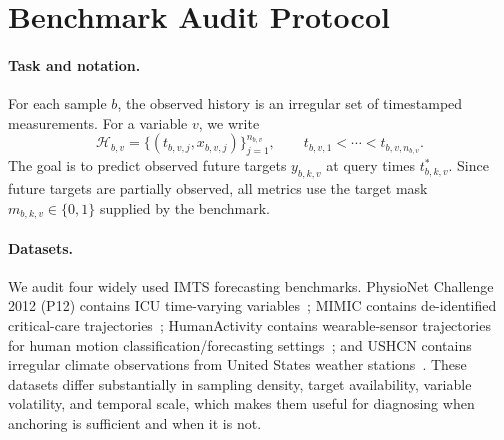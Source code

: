 \documentclass{article}
\begin{document}
\section{Benchmark Audit Protocol}

\paragraph{Task and notation.}
For each sample $b$, the observed history is an irregular set of timestamped
measurements. For a variable $v$, we write
\begin{equation}
    \mathcal H_{b,v}=\{(t_{b,v,j},x_{b,v,j})\}_{j=1}^{n_{b,v}},
    \qquad t_{b,v,1}<\cdots<t_{b,v,n_{b,v}}.
\end{equation}
The goal is to predict observed future targets $y_{b,k,v}$ at query times
$t^*_{b,k,v}$. Since future targets are partially observed, all
metrics use the target mask $m_{b,k,v}\in\{0,1\}$ supplied by the benchmark.

\paragraph{Datasets.}
We audit four widely used IMTS forecasting benchmarks. PhysioNet Challenge 2012
(P12) contains ICU time-varying variables~\citep{Silva2012PhysioNet2}; MIMIC
contains de-identified critical-care trajectories~\citep{Johnson2016MIMIC};
HumanActivity contains wearable-sensor trajectories for human motion
classification/forecasting settings~\citep{apn}; and USHCN
contains irregular climate observations from United States weather
stations~\citep{Menne2016USHCN}. These datasets differ substantially in
sampling density, target availability, variable volatility, and temporal scale,
which makes them useful for diagnosing when anchoring is sufficient and when it
is not.
\end{document}
